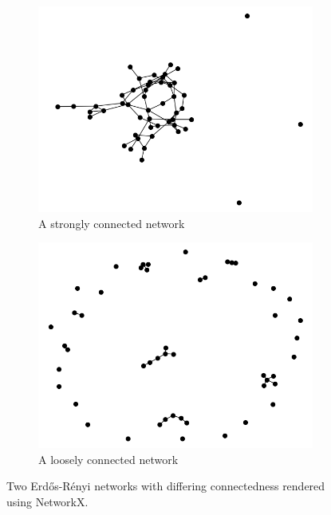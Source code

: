 \begin{figure}
    \begin{center}
        \begin{subfigure}[b]{0.45\textwidth}
            \includegraphics[width=\textwidth]{img/2/high_prob}
            \caption{A strongly connected network}
            \label{fig:strongly_connected_network}
        \end{subfigure}
        \begin{subfigure}[b]{0.45\textwidth}
            \includegraphics[width=\textwidth]{img/2/low_prob}
            \caption{A loosely connected network}
            \label{fig:loosely_connected_network}
        \end{subfigure}
    \end{center}
    \caption{Two Erd\H{o}s-R\'{e}nyi\cite{erdos_renyi}  networks with differing connectedness rendered using NetworkX\cite{SciPyProceedings_11}.}
    \label{fig:connectivity_strengths}
\end{figure}

